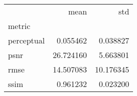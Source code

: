 \begin{tabular}{lrr}
\toprule
{} &       mean &        std \\
metric     &            &            \\
\midrule
perceptual &   0.055462 &   0.038827 \\
psnr       &  26.724160 &   5.663801 \\
rmse       &  14.507083 &  10.176345 \\
ssim       &   0.961232 &   0.023200 \\
\bottomrule
\end{tabular}
